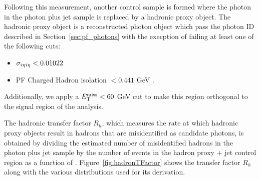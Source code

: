 Following this measurement, another control sample is formed where the photon in the photon plus jet sample is replaced by a hadronic proxy object. 
The hadronic proxy object is a reconstructed photon object which pass the photon ID described in Section~\ref{sec:pf_photons} with the execption of failing at least one of the following cuts: 
\begin{itemize}
\item $\sigma_{i\eta i\eta} < 0.01022$
\item PF Charged Hadron isolation $< 0.441$ GeV .
\end{itemize}
Additionally, we apply a $E_{\mathrm{T}}^{\text{miss}} < 60$ GeV cut to make this region orthogonal to the signal region of the analysis.
  
The hadronic transfer factor $R_{h}$, which measures the rate at which hadronic proxy objects result in hadrons that are misidentified as candidate photons, is obtained by dividing the estimated number of misidentified hadrons in the photon plus jet sample by the number of events in the hadron proxy + jet control region as a function of \pt. 
Figure~\ref{fig:hadronTFactor} shows the transfer factor $R_{h}$ along with the various distributions used for its derivation.

